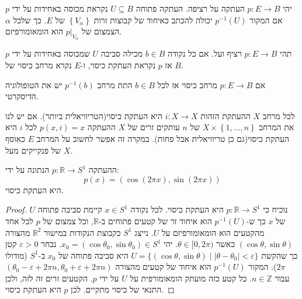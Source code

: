 \documentclass{tstextbook}
\begin{document}
\begin{definition}
יהי \(p:E\to B\) העתקה על רציפה. העתקה פתוחה \(U\subseteq B\) נקראת מכוסה באחידות על ידי \(p\) אם המקור \(p ^{-1}(U)\) יכולה להכתב כאיחוד של קבוצות זרות \(\left\{  V_{\alpha}  \right\}\) של \(E\). כך שלכל \(\alpha\) הצמצום של \(p|_{V_{\alpha}}\) הוא הומאומורפיזם.

\end{definition}
\begin{definition}
תהי \(p:E\to B\) רציף ועל. אם כל נקודה \(b \in B\) מכילה סביבה \(U\) שמכוסה באחידות על ידי \(p\) אז \(p\) נקראת העתקת כיסוי, ו-\(E\) נקרא מרחב כיסוי של \(B\).

\end{definition}
\begin{remark}
אם \(p:E\to B\) מרחב כיסוי אז לכל \(b \in B\) התת מרחב \(p ^{-1}(b)\) יש את הטופולוגיה הדיסקרטי.

\end{remark}
\begin{example}
לכל מרחב \(X\) ההעתקת הזהות \(i:X\to X\) היא העתקת כיסוי(הטריוויאלית ביותר). אם יש לנו את המרחב \(X\times \left\{  1,\dots,n \right\}\) של \(n\) עותקים זרים של \(X\) ההעתקה \(p(x,i)=x\) לכל \(i\) היא העתקת כיסוי(גם כן טריוויאלית אבל פחות). במקרה זה אפשר לחשוב על המרחב \(E\) כאוסף של פנקייקים מעל \(X\).

\end{example}
\begin{example}
ההעתקה \(p:\mathbb{R}\to S^{1}\) הנתונה על ידי:
$$p(x)=\left( \cos\left( 2\pi x \right),\sin\left( 2\pi x \right) \right)$$
היא העתקת כיסוי.

\end{example}
\begin{proof}
נוכיח כי \(p:\mathbb{R}\to S^{1}\) היא העתקת כיסוי. לכל נקודה \(x\in S^{1}\) קיימת סביבה פתוחה \(U\) של \(x\) כך ש-\(p^{-1}(U)\) הוא איחוד זר של קטעים פתוחים ב-\(\mathbb{R}\), וכל צמצום של \(p\) לכל אחד מהקטעים הוא הומאומורפיזם על \(U\).
נייצג \(S^{1}\) כקבוצת הנקודות במישור \(\mathbb{R}^{2}\) מהצורה \((\cos\theta,\sin\theta)\) כאשר \(\theta\in[0,2\pi)\). יהי \(x_{0}=(\cos\theta_{0},\sin\theta_{0})\in S^{1}\). נבחר \(\varepsilon>0\) קטן כך שהקשת \(U=\{(\cos\theta,\sin\theta)\mid |\theta-\theta_{0}|<\varepsilon\}\) היא סביבה פתוחה של \(x_{0}\) ב-\(S^{1}\) (מודולו \(2\pi\)).
המקור \(p^{-1}(U)\) הוא איחוד של קטעים מהצורה \((\theta_{0}-\varepsilon+2\pi n,\theta_{0}+\varepsilon+2\pi n)\) עבור \(n\in\mathbb{Z}\). כל קטע כזה מועתק הומאומורפית על \(U\) על ידי \(p\). הקטעים זרים זה לזה, ולכן התנאי של כיסוי מתקיים.
לכן \(p\) היא העתקת כיסוי.

\end{proof}
\end{document}
